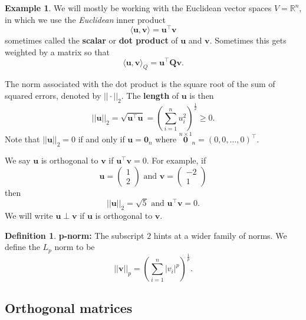 \documentclass[
]{book}
\theoremstyle{definition}
\newtheorem{definition}{Definition}[chapter]
\theoremstyle{definition}
\newtheorem{example}{Example}[chapter]
\theoremstyle{definition}
\theoremstyle{definition}
\theoremstyle{remark}
\begin{document}
\begin{example}
\protect\hypertarget{exm:Rp3}{}{\label{exm:Rp3} }We will mostly be working with the Euclidean vector spaces \(V=\mathbb{R}^n\), in which we use the \emph{Euclidean} inner product
\[\langle \mathbf u, \mathbf v\rangle = \mathbf u^\top \mathbf v\]
sometimes called the \textbf{scalar} or \textbf{dot product} of \(\mathbf u\) and \(\mathbf v\). Sometimes this gets weighted by a matrix so that
\[\langle \mathbf u, \mathbf v\rangle_Q = \mathbf u^\top \mathbf Q\mathbf v.\]

The norm associated with the dot product is the square root of the sum of squared errors, denoted by \(|| \cdot ||_2\).
The \textbf{length} of \(\mathbf u\) is then
\[||\mathbf u||_2=\sqrt{\mathbf u^\top \mathbf u} =\left( \sum_{i=1}^n u_i^2\right)^\frac{1}{2}\geq 0.\]
Note that \(||\mathbf u||_2=0\) if and only if \(\mathbf u={\mathbf 0}_n\) where \(\stackrel{n\times 1}{\mathbf 0}_n=(0,0,\dots ,0)^\top\).

We say \(\mathbf u\) is orthogonal to \(\mathbf v\) if \(\mathbf u^\top \mathbf v=0\).
For example, if
\[\mathbf u=\left(\begin{array}{c}1\\2\end{array}\right) \mbox{ and } \mathbf v=\left(\begin{array}{c}-2\\1\end{array}\right)\]
then
\[||\mathbf u||_2 = \sqrt{5}\mbox{ and } \mathbf u^\top \mathbf v=0.\]
We will write \(\mathbf u\perp \mathbf v\) if \(\mathbf u\) is orthogonal to \(\mathbf v\).
\end{example}

\begin{definition}
\protect\hypertarget{def:pnorms}{}{\label{def:pnorms} }\textbf{p-norm:} The subscript \(2\) hints at a wider family of norms. We define the \(L_p\) norm to be
\[|| \mathbf v||_p = \left(\sum_{i=1}^n |v_i|^p\right)^\frac{1}{p}.\]
\end{definition}

\hypertarget{orthogonal-matrices}{%
\subsection{Orthogonal matrices}\label{orthogonal-matrices}}
\end{document}
